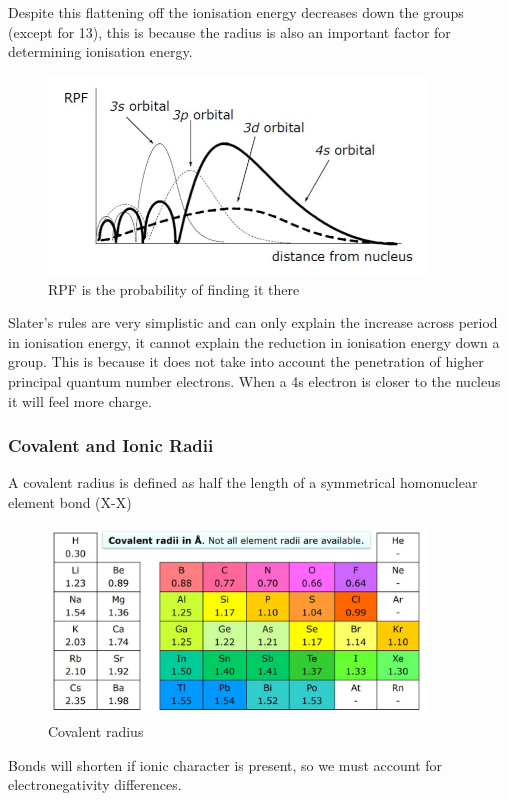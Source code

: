 \documentclass{article}
\newcommand{\NB}{{\large\lefthand}\quad}
\begin{document}
    Despite this flattening off the ionisation energy decreases down the groups (except for 13), this is because
    the radius is also an important factor for determining ionisation energy.

    \begin{figure}[h]
        \centering
        \includegraphics[width=10cm]{pen.jpg}
        \caption{RPF is the probability of finding it there}
    \end{figure}

    Slater's rules are very simplistic and can only explain the increase across period in ionisation energy, it 
    cannot explain the reduction in ionisation energy down a group. This is because it does not take into account
    the penetration of higher principal quantum number electrons. When a 4s electron is closer to the nucleus 
    it will feel more charge.
    \newpage
    \subsubsection{Covalent and Ionic Radii}

    A covalent radius is defined as half the length of a symmetrical homonuclear element bond (X-X)

    \begin{figure}[h]
        \centering
        \includegraphics[width=10cm]{covrad.jpg}
        \caption{Covalent radius}
    \end{figure}

    \NB Bonds will shorten if ionic character is present, so we must account for electronegativity differences.
\end{document}

